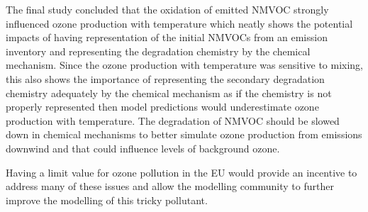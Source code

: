 The final study concluded that the oxidation of emitted NMVOC strongly influenced ozone production with temperature which neatly shows the potential impacts of having representation of the initial NMVOCs from an emission inventory and representing the degradation chemistry by the chemical mechanism.
Since the ozone production with temperature was sensitive to mixing, this also shows the importance of representing the secondary degradation chemistry adequately by the chemical mechanism as if the chemistry is not properly represented then model predictions would underestimate ozone production with temperature.
The degradation of NMVOC should be slowed down in chemical mechanisms to better simulate ozone production from emissions downwind and that could influence levels of background ozone.

Having a limit value for ozone pollution in the EU would provide an incentive to address many of these issues and allow the modelling community to further improve the modelling of this tricky pollutant.
